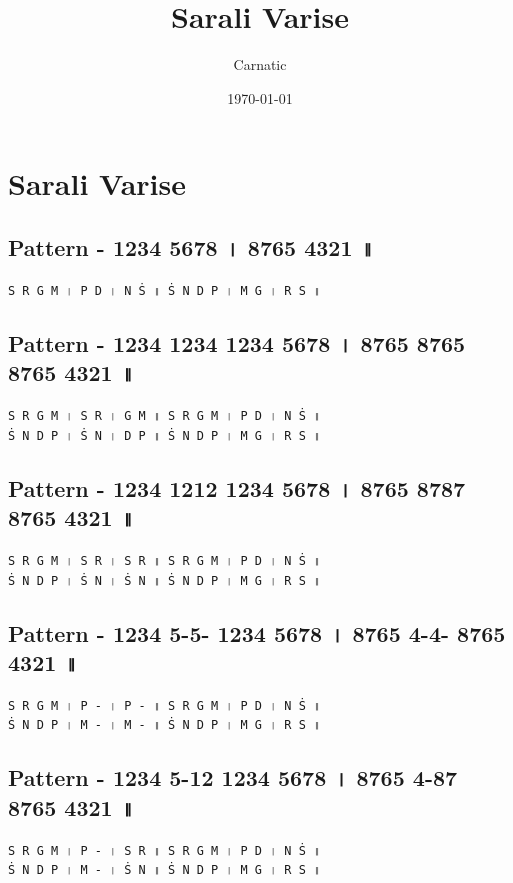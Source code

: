 \documentclass[12pt]{article}
\title{Sarali Varise}
\author{Carnatic}
\date{\today}
\newcommand{\df}[1]{{\devanagarifont#1}}
\begin{document}
\fontsize{18}{21}\selectfont

\section{Sarali Varise}
\subsection{Pattern - 1234 5678 \df{।} 8765 4321 \df{॥}}
\texttt{S~R~G~M~\df{।}~P~D~\df{।}~N~Ṡ~\df{॥}~Ṡ~N~D~P~\df{।}~M~G~\df{।}~R~S~\df{॥}}\\
\subsection{Pattern - 1234 1234 1234 5678 \df{।} 8765 8765 8765 4321 \df{॥}}
\texttt{S~R~G~M~\df{।}~S~R~\df{।}~G~M~\df{॥}~S~R~G~M~\df{।}~P~D~\df{।}~N~Ṡ~\df{॥}}\\
\texttt{Ṡ~N~D~P~\df{।}~Ṡ~N~\df{।}~D~P~\df{॥}~Ṡ~N~D~P~\df{।}~M~G~\df{।}~R~S~\df{॥}}\\
\subsection{Pattern - 1234 1212 1234 5678 \df{।} 8765 8787 8765 4321 \df{॥}}
\texttt{S~R~G~M~\df{।}~S~R~\df{।}~S~R~\df{॥}~S~R~G~M~\df{।}~P~D~\df{।}~N~Ṡ~\df{॥}}\\
\texttt{Ṡ~N~D~P~\df{।}~Ṡ~N~\df{।}~Ṡ~N~\df{॥}~Ṡ~N~D~P~\df{।}~M~G~\df{।}~R~S~\df{॥}}\\
\subsection{Pattern - 1234 5-5- 1234 5678 \df{।} 8765 4-4- 8765 4321 \df{॥}}
\texttt{S~R~G~M~\df{।}~P~-~\df{।}~P~-~\df{॥}~S~R~G~M~\df{।}~P~D~\df{।}~N~Ṡ~\df{॥}}\\
\texttt{Ṡ~N~D~P~\df{।}~M~-~\df{।}~M~-~\df{॥}~Ṡ~N~D~P~\df{।}~M~G~\df{।}~R~S~\df{॥}}\\
\subsection{Pattern - 1234 5-12 1234 5678 \df{।} 8765 4-87 8765 4321 \df{॥}}
\texttt{S~R~G~M~\df{।}~P~-~\df{।}~S~R~\df{॥}~S~R~G~M~\df{।}~P~D~\df{।}~N~Ṡ~\df{॥}}\\
\texttt{Ṡ~N~D~P~\df{।}~M~-~\df{।}~Ṡ~N~\df{॥}~Ṡ~N~D~P~\df{।}~M~G~\df{।}~R~S~\df{॥}}\\
\end{document}
